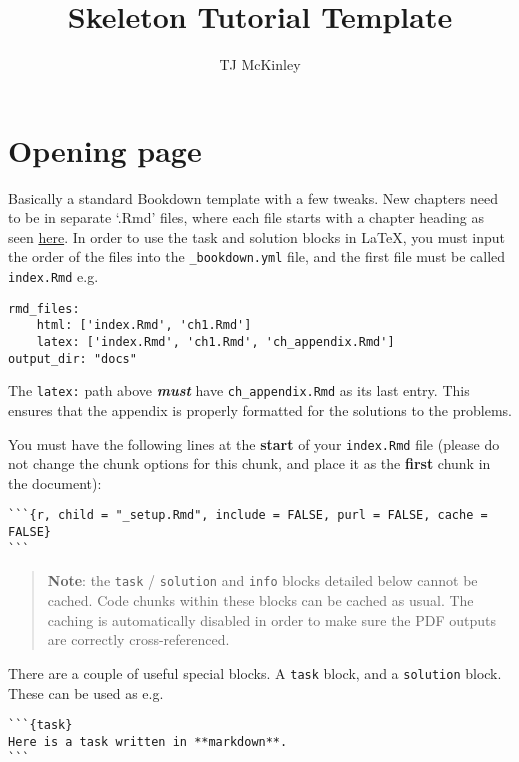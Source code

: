 \documentclass[
]{book}
\title{Skeleton Tutorial Template}
\author{TJ McKinley}
\date{}
\begin{document}
\maketitle

{
\hypersetup{linkcolor=}
\setcounter{tocdepth}{1}
\tableofcontents
}
\chapter{Opening page}\label{opening-page}

Basically a standard Bookdown template with a few tweaks. New chapters need to be in separate `.Rmd' files, where each file starts with a chapter heading as seen \href{https://bookdown.org/yihui/bookdown/usage.html}{here}. In order to use the task and solution blocks in \LaTeX, you must input the order of the files into the \texttt{\_bookdown.yml} file, and the first file must be called \texttt{index.Rmd} e.g.

\begin{verbatim}
rmd_files:
    html: ['index.Rmd', 'ch1.Rmd']
    latex: ['index.Rmd', 'ch1.Rmd', 'ch_appendix.Rmd']
output_dir: "docs"
\end{verbatim}

The \texttt{latex:} path above \textbf{\emph{must}} have \texttt{\textquotesingle{}ch\_appendix.Rmd\textquotesingle{}} as its last entry. This ensures that the appendix is properly formatted for the solutions to the problems.

You must have the following lines at the \textbf{start} of your \texttt{index.Rmd} file (please do not change the chunk options for this chunk, and place it as the \textbf{first} chunk in the document):

\begin{verbatim}
```{r, child = "_setup.Rmd", include = FALSE, purl = FALSE, cache = FALSE}
```
\end{verbatim}

\begin{quote}
\textbf{Note}: the \texttt{task} / \texttt{solution} and \texttt{info} blocks detailed below cannot be cached. Code chunks within these blocks can be cached as usual. The caching is automatically disabled in order to make sure the PDF outputs are correctly cross-referenced.
\end{quote}

There are a couple of useful special blocks. A \texttt{task} block, and a \texttt{solution} block. These can be used as e.g.

\begin{verbatim}
```{task}
Here is a task written in **markdown**.
```
\end{verbatim}
\end{document}
